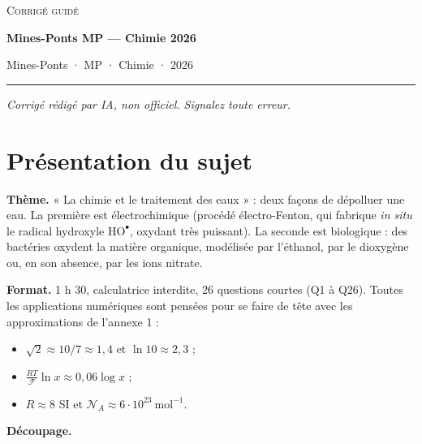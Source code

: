 \documentclass[11pt,a4paper]{article}
\providecommand{\tightlist}{\setlength{\itemsep}{0pt}\setlength{\parskip}{0pt}}
\begin{document}
\thispagestyle{plain}
\begin{center}
  {\small\scshape Corrigé guidé}\par\smallskip
  {\LARGE\bfseries Mines-Ponts MP — Chimie 2026\par}\medskip
  {\large Mines-Ponts · MP · Chimie · 2026\par}
\end{center}
\vspace{2pt}\hrule\vspace{8pt}

\emph{Corrigé rédigé par IA, non officiel. Signalez toute erreur.}

\hypertarget{pruxe9sentation-du-sujet}{%
\section{Présentation du sujet}\label{pruxe9sentation-du-sujet}}

\textbf{Thème.} « La chimie et le traitement des eaux » : deux façons de dépolluer une eau. La première est électrochimique (procédé électro-Fenton, qui fabrique \emph{in situ} le radical hydroxyle \(\mathrm{HO^\bullet}\), oxydant très puissant). La seconde est biologique : des bactéries oxydent la matière organique, modélisée par l'éthanol, par le dioxygène ou, en son absence, par les ions nitrate.

\textbf{Format.} 1 h 30, calculatrice interdite, 26 questions courtes (Q1 à Q26). Toutes les applications numériques sont pensées pour se faire de tête avec les approximations de l'annexe 1 :

\begin{itemize}
\tightlist
\item
  \(\sqrt2\approx10/7\approx1{,}4\) et \(\ln10\approx2{,}3\) ;
\item
  \(\frac{RT}{\mathcal F}\ln x\approx0{,}06\log x\) ;
\item
  \(R\approx8\) SI et \(\mathcal N_A\approx6\cdot10^{23}\ \mathrm{mol^{-1}}\).
\end{itemize}

\textbf{Découpage.}
\end{document}
